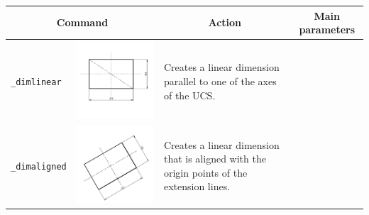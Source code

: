 \documentclass[..]{../IEEEphot}
\begin{document}
\begin{center}
\begin{longtable}{m{.2\linewidth}m{.2\linewidth}m{.25\linewidth}m{.25\linewidth}}
\toprule
    \multicolumn{2}{c}{\bfseries Command} &
    \multicolumn{1}{c}{\bfseries Action} &
    \multicolumn{1}{c}{\bfseries Main parameters} \\
\midrule
\texttt{\_dimlinear} & \includegraphics[width = 0.8\linewidth, keepaspectratio]{../images/jpg/_dimlinear.jpg} & Creates a linear dimension parallel to one of the axes of the UCS. & 
\\
\midrule
\texttt{\_dimaligned} & \includegraphics[width = 0.8\linewidth, keepaspectratio]{../images/jpg/_dimaligned.jpg} & Creates a linear dimension that is aligned with the origin points of the extension lines. & 

\end{longtable}
\end{center}
\end{document}
